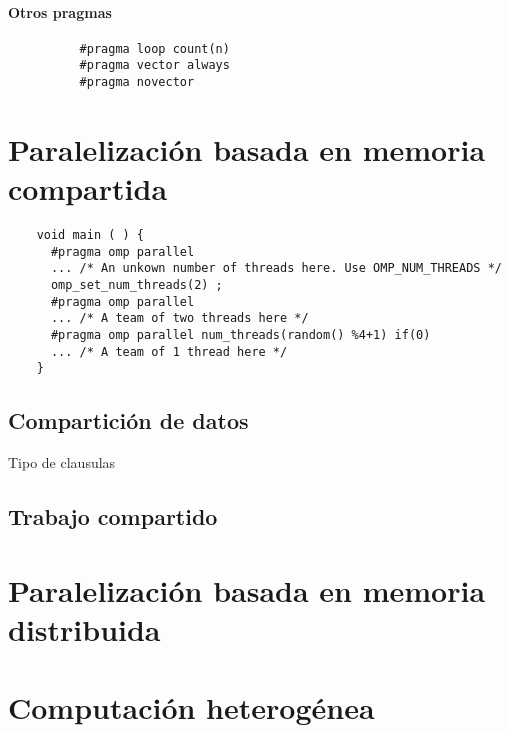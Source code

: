 \documentclass{article}
\begin{document}
      \paragraph{Otros pragmas}

        \begin{verbatim}
          #pragma loop count(n)
          #pragma vector always
          #pragma novector
        \end{verbatim}

\section{Paralelización basada en memoria compartida}
  \begin{verbatim}
    void main ( ) {
      #pragma omp parallel
      ... /* An unkown number of threads here. Use OMP_NUM_THREADS */
      omp_set_num_threads(2) ;
      #pragma omp parallel
      ... /* A team of two threads here */
      #pragma omp parallel num_threads(random() %4+1) if(0)
      ... /* A team of 1 thread here */
    }
  \end{verbatim}
  \subsection{Compartición de datos}
    Tipo de clausulas
  \subsection{Trabajo compartido}
\section{Paralelización basada en memoria distribuida}
\section{Computación heterogénea}
\end{document}
